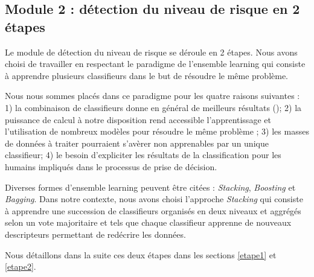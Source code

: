 \subsection{Module 2 : détection du niveau de risque en 2 étapes}\label{module2}

Le module de détection du niveau de risque se déroule en 2 étapes.
Nous avons choisi de travailler en respectant le paradigme de l’ensemble learning qui consiste à apprendre plusieurs classifieurs dans le but de résoudre le même problème.

Nous nous sommes placés dans ce paradigme pour les quatre raisons suivantes : 1) la combinaison de classifieurs donne en général de meilleurs résultats (\cite{wang2003mining}); 2) la puissance de calcul à notre disposition rend accessible l’apprentissage et l’utilisation de nombreux modèles pour résoudre le même problème ; 3) les  masses de données à traiter  pourraient s’avèrer  non apprenables par un unique classifieur;
4) le besoin d'expliciter les résultats de la classification pour les humains impliqués dans le processus de prise de décision. %

Diverses formes d’ensemble learning peuvent être citées : \emph{Stacking}, \emph{Boosting} et \emph{Bagging}. 
Dans notre contexte, nous avons choisi l'approche \emph{Stacking} qui consiste à apprendre une succession de classifieurs organisés en  deux niveaux et aggrégés selon un vote majoritaire et tels que chaque classifieur apprenne de nouveaux descripteurs permettant de redécrire les données.

Nous détaillons dans la suite ces deux étapes dans les sections  \ref{etape1} et  \ref{etape2}.

